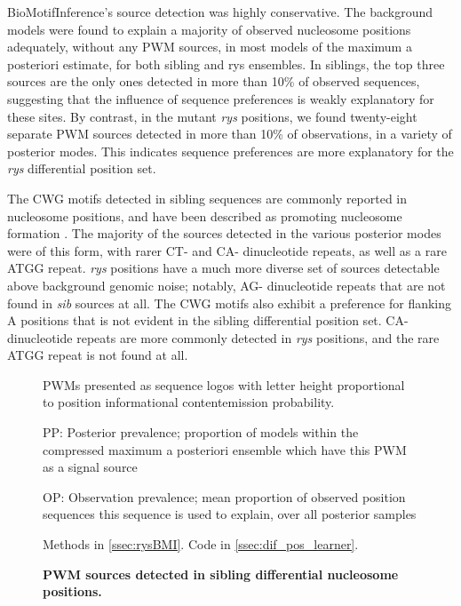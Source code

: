BioMotifInference's source detection was highly conservative. The background models were found to explain a majority of observed nucleosome positions adequately, without any PWM sources, in most models of the maximum a posteriori estimate, for both sibling and rys ensembles. In siblings, the top three sources are the only ones detected in more than 10\% of observed sequences, suggesting that the influence of sequence preferences is weakly explanatory for these sites. By contrast, in the mutant \textit{rys} positions, we found twenty-eight separate PWM sources detected in more than 10\% of observations, in a variety of posterior modes. This indicates sequence preferences are more explanatory for the \textit{rys} differential position set.

The CWG motifs detected in sibling sequences are commonly reported in nucleosome positions, and have been described as promoting nucleosome formation \cite{Hasan2003}. The majority of the sources detected in the various posterior modes were of this form, with rarer CT- and CA- dinucleotide repeats, as well as a rare ATGG repeat. \textit{rys} positions have a much more diverse set of sources detectable above background genomic noise; notably, AG- dinucleotide repeats that are not found in \textit{sib} sources at all. The CWG motifs also exhibit a preference for flanking A positions that is not evident in the sibling differential position set. CA- dinucleotide repeats are more commonly detected in \textit{rys} positions, and the rare ATGG repeat is not found at all.

\begin{figure}[!h]
    \caption{{\bf PWM sources detected in sibling differential nucleosome positions.}}
    PWMs presented as sequence logos with letter height proportional to position informational content\/emission probability.
    
    PP: Posterior prevalence; proportion of models within the compressed maximum a posteriori ensemble which have this PWM as a signal source

    OP: Observation prevalence; mean proportion of observed position sequences this sequence is used to explain, over all posterior samples

    Methods in \autoref{ssec:rysBMI}.
    Code in \autoref{ssec:dif_pos_learner}.
    \label{sibmotifs}
\end{figure}

